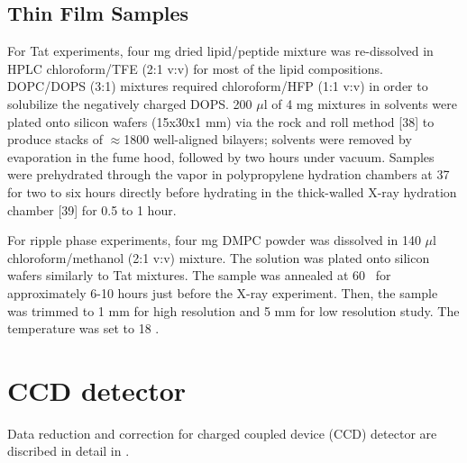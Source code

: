 \subsection{Thin Film Samples}

For Tat experiments, four mg dried lipid/peptide mixture was re-dissolved in HPLC chloroform/TFE 
(2:1 v:v)
for most of the lipid compositions. 
DOPC/DOPS (3:1) mixtures required
chloroform/HFP (1:1 v:v) in order to solubilize the negatively charged DOPS. 
200 $\mu$l of 4 mg
mixtures in solvents were plated onto silicon wafers (15x30x1 mm) via the rock 
and roll method
[38] to produce stacks of $\approx$1800 well-aligned bilayers; 
solvents were removed by 
evaporation in
the fume hood, followed by two hours under vacuum. Samples were prehydrated 
through the
vapor in polypropylene hydration chambers at 37 \degC for two to six hours 
directly before hydrating in the
thick-walled X-ray hydration chamber [39] for 0.5 to 1 hour. 

For ripple phase experiments, four mg DMPC powder was dissolved in 
140 $\mu$l chloroform/methanol (2:1 v:v) mixture. The solution was
plated onto silicon wafers similarly to Tat mixtures. 
The sample was annealed at 60 \textcelsius\ for approximately
6-10 hours just before the X-ray experiment. 
Then, the sample was trimmed to 1 mm for high
resolution and 5 mm for low resolution study. The temperature
was set to 18 \textcelsius. 

\section{CCD detector}
Data reduction and correction for charged coupled device (CCD) detector
are discribed in detail in \cite{ref:Burner}.

